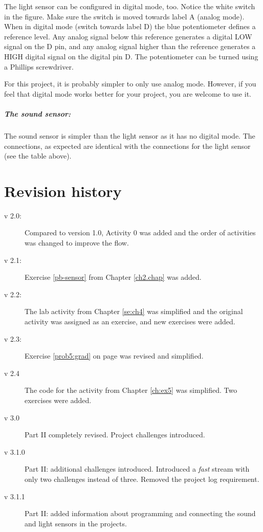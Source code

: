 \documentclass[12pt]{book}
\begin{document}
The light sensor can be configured in digital mode, too. Notice the white switch in the figure. Make sure the switch is moved towards label A (analog mode). When in digital mode (switch towards label D) the blue potentiometer  defines a reference level. Any analog signal below this reference generates a digital LOW signal on the D pin, and any analog signal higher than the reference generates a HIGH digital signal on the digital pin D. The potentiometer can be turned using a Phillips screwdriver.

For this project, it is probably simpler to only use analog mode. However, if you feel that digital mode works better for your project, you are welcome to use it.

\paragraph{The sound sensor:} The sound sensor is simpler than the light sensor as it has no digital mode. The connections, as expected are identical with the connections for the light sensor (see the table above).



\appendix
\chapter{Revision history}

\begin{description}
\item[v 2.0:] Compared to version 1.0, Activity 0 was added and the
  order of activities was changed to improve the flow.
\item[v 2.1:] Exercise \ref{pb-sensor} from Chapter \ref{ch2.chap} was
  added.
\item[v 2.2:] The lab activity from Chapter \ref{se:ch4} was
  simplified and the original activity was assigned as an exercise,
  and new exercises were added.
\item[v 2.3:] Exercise \ref{prob5:grad} on page \pageref{prob5:grad}
  was revised and simplified.
\item[v 2.4] The code for the activity from Chapter \ref{ch:ex5} was
  simplified. Two exercises were added.
\item[v 3.0] Part II completely revised. Project challenges introduced.

\item[v 3.1.0] Part II: additional challenges introduced. Introduced a \emph{fast} stream with only two challenges instead of three. Removed the project log requirement.

  \item[v 3.1.1] Part II: added information about programming and connecting the sound and light sensors in the projects.
  
\end{description}
 
\end{document}
